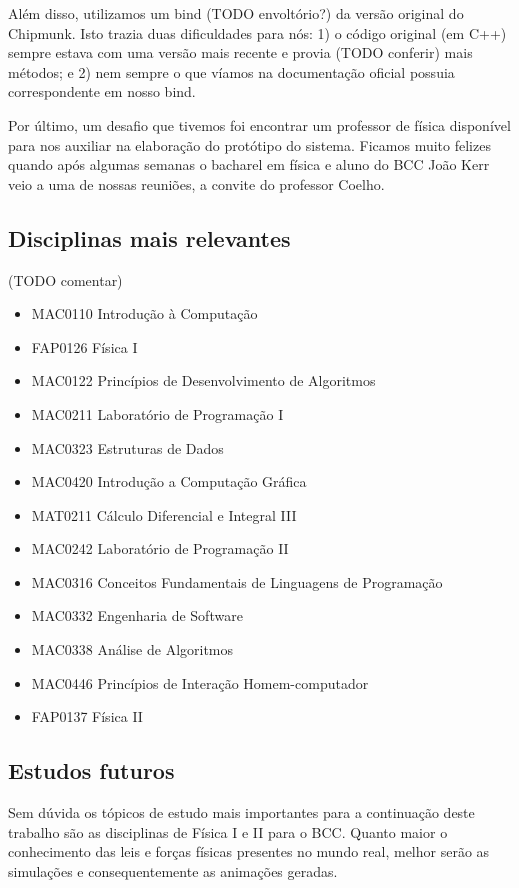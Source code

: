 Além disso, utilizamos um bind (TODO envoltório?) da versão original do Chipmunk. Isto trazia duas dificuldades para nós: 1) o código original (em C++) sempre estava com uma versão mais recente e provia (TODO conferir) mais métodos; e 2) nem sempre o que víamos na documentação oficial possuia correspondente em nosso bind. 
 
Por último, um desafio que tivemos foi encontrar um professor de física disponível para nos auxiliar na elaboração do protótipo do sistema. Ficamos muito felizes quando após algumas semanas o bacharel em física e aluno do BCC João Kerr veio a uma de nossas reuniões, a convite do professor Coelho.

\subsection{Disciplinas mais relevantes}

(TODO comentar)
\begin{itemize}
\item MAC0110 	Introdução à Computação 
\item FAP0126 	Física I 
\item MAC0122 	Princípios de Desenvolvimento de Algoritmos 
\item MAC0211 	Laboratório de Programação I 
\item MAC0323 	Estruturas de Dados 
\item MAC0420 	Introdução a Computação Gráfica 
\item MAT0211 	Cálculo Diferencial e Integral III 
\item MAC0242 	Laboratório de Programação II 
\item MAC0316 	Conceitos Fundamentais de Linguagens de Programação 	
\item MAC0332 	Engenharia de Software 
\item MAC0338 	Análise de Algoritmos
\item MAC0446 	Princípios de Interação Homem-computador 
\item FAP0137 	Física II 
\end{itemize}
\subsection{Estudos futuros} 
Sem dúvida os tópicos de estudo mais importantes para a continuação deste trabalho são as disciplinas de Física I e II para o BCC. Quanto maior o conhecimento das leis e forças físicas presentes no mundo real, melhor serão as simulações e consequentemente as animações geradas.

